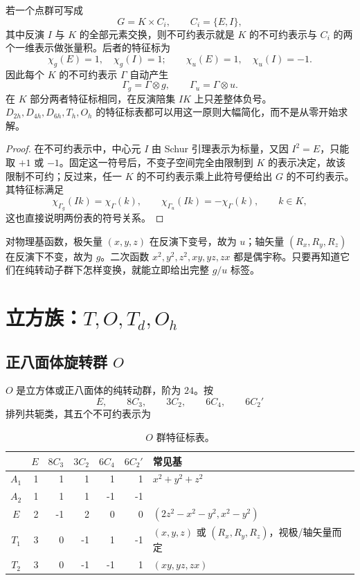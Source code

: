 \begin{proposition}[中心反演的宇称加倍]
若一个点群可写成
\[
G=K\times C_i,
\qquad C_i=\{E,I\},
\]
其中反演 $I$ 与 $K$ 的全部元素交换，则不可约表示就是 $K$ 的不可约表示与 $C_i$ 的两个一维表示做张量积。后者的特征标为
\[
\chi_g(E)=1,\quad \chi_g(I)=1;
\qquad
\chi_u(E)=1,\quad \chi_u(I)=-1.
\]
因此每个 $K$ 的不可约表示 $\Gamma$ 自动产生
\[
\Gamma_g=\Gamma\otimes g,
\qquad
\Gamma_u=\Gamma\otimes u.
\]
在 $K$ 部分两者特征标相同，在反演陪集 $IK$ 上只差整体负号。$D_{2h},D_{4h},D_{6h},T_h,O_h$ 的特征标表都可以用这一原则大幅简化，而不是从零开始求解。
\end{proposition}
\begin{proof}
在不可约表示中，中心元 $I$ 由 Schur 引理表示为标量，又因 $I^2=E$，只能取 $+1$ 或 $-1$。固定这一符号后，不变子空间完全由限制到 $K$ 的表示决定，故该限制不可约；反过来，任一 $K$ 的不可约表示乘上此符号便给出 $G$ 的不可约表示。其特征标满足
\[
\chi_{\Gamma_g}(Ik)=\chi_\Gamma(k),\qquad
\chi_{\Gamma_u}(Ik)=-\chi_\Gamma(k),\qquad k\in K,
\]
这也直接说明两份表的符号关系。
\end{proof}

对物理基函数，极矢量 $(x,y,z)$ 在反演下变号，故为 $u$；轴矢量 $(R_x,R_y,R_z)$ 在反演下不变，故为 $g$。二次函数 $x^2,y^2,z^2,xy,yz,zx$ 都是偶宇称。只要再知道它们在纯转动子群下怎样变换，就能立即给出完整 $g/u$ 标签。

\section{\texorpdfstring{立方族：$T,O,T_d,O_h$}{立方族：T, O, Td, Oh}}

\subsection{\texorpdfstring{正八面体旋转群 $O$}{正八面体旋转群 O}}

$O$ 是立方体或正八面体的纯转动群，阶为 $24$。按
\[
E,\qquad 8C_3,\qquad 3C_2,\qquad 6C_4,\qquad 6C_2'
\]
排列共轭类，其五个不可约表示为
\begin{table}[htbp]
\centering
\caption{$O$ 群特征标表。}
\label{tab:O-character}
\begin{tabular}{c|rrrrr|l}
\toprule
 & $E$ & $8C_3$ & $3C_2$ & $6C_4$ & $6C_2'$ & 常见基 \\
\midrule
$A_1$ & 1& 1& 1& 1& 1 & $x^2+y^2+z^2$\\
$A_2$ & 1& 1& 1&-1&-1 & \\
$E$   & 2&-1& 2& 0& 0 & $(2z^2-x^2-y^2,x^2-y^2)$\\
$T_1$ & 3& 0&-1& 1&-1 & $(x,y,z)$ 或 $(R_x,R_y,R_z)$，视极/轴矢量而定\\
$T_2$ & 3& 0&-1&-1& 1 & $(xy,yz,zx)$\\
\bottomrule
\end{tabular}
\end{table}

